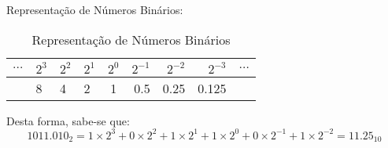 \documentclass{article}
\begin{document}
                \begin{example}
                    Representação de Números Binários:
                        \begin{table}[H]
                            \centering  
                            \begin{tabular}[]{r lll c rrr l}
                                $\dots$ & $2^3$ & $2^2$ & $2^1$ & $2^0$ & $2^{-1}$ & $2^{-2}$ & $2^{-3}$ & $\dots$\\\hline
                                        & 8     & 4     & 2     & 1     & 0.5      & 0.25     & 0.125    & \\
                            \end{tabular}
                            \caption{Representação de Números Binários}
                        \end{table}\noindent
                    Desta forma, sabe-se que:
                        \begin{equation*}
                            \boxed{
                                1011.010_{2} = 
                                1 \times 2^{ 3} + 
                                0 \times 2^{ 2} + 
                                1 \times 2^{ 1} + 
                                1 \times 2^{ 0} + 
                                0 \times 2^{-1} + 
                                1 \times 2^{-2}
                                 = 
                                 11.25_{10}
                            }
                        \end{equation*}
                \end{example}
\end{document}
